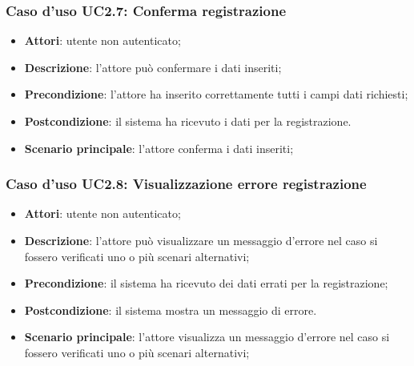 \subsubsection{Caso d'uso UC2.7: Conferma registrazione}
\begin{itemize}
\item \textbf{Attori}: utente non autenticato;
\item \textbf{Descrizione}: l'attore può confermare i dati inseriti;
\item \textbf{Precondizione}: l'attore ha inserito correttamente tutti i campi dati richiesti;
\item \textbf{Postcondizione}: il sistema ha ricevuto i dati per la registrazione.
\item \textbf{Scenario principale}: l'attore conferma i dati inseriti;
\end{itemize}

\subsubsection{Caso d'uso UC2.8: Visualizzazione errore registrazione}
\begin{itemize}
\item \textbf{Attori}: utente non autenticato;
\item \textbf{Descrizione}: l'attore può visualizzare un messaggio d'errore nel caso si fossero verificati uno o più scenari alternativi;
\item \textbf{Precondizione}: il sistema ha ricevuto dei dati errati per la registrazione;
\item \textbf{Postcondizione}: il sistema mostra un messaggio di errore.
\item \textbf{Scenario principale}: l'attore visualizza un messaggio d'errore nel caso si fossero verificati uno o più scenari alternativi;
\end{itemize}
